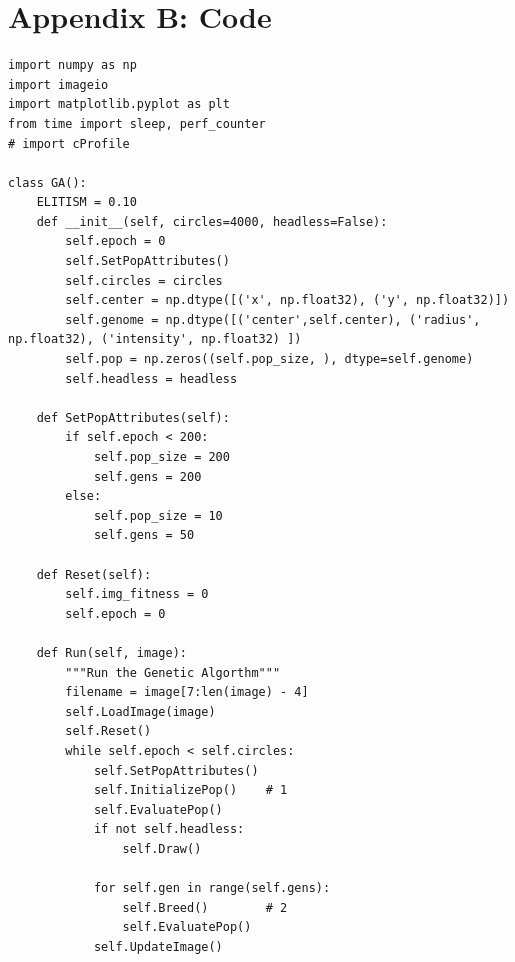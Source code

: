 \documentclass[12pt]{article}
\begin{document}






\newpage
\section*{Appendix B: Code}
\begin{verbatim}
import numpy as np
import imageio
import matplotlib.pyplot as plt
from time import sleep, perf_counter
# import cProfile

class GA():
    ELITISM = 0.10
    def __init__(self, circles=4000, headless=False):
        self.epoch = 0
        self.SetPopAttributes()
        self.circles = circles
        self.center = np.dtype([('x', np.float32), ('y', np.float32)])
        self.genome = np.dtype([('center',self.center), ('radius', np.float32), ('intensity', np.float32) ])
        self.pop = np.zeros((self.pop_size, ), dtype=self.genome)
        self.headless = headless

    def SetPopAttributes(self):
        if self.epoch < 200:
            self.pop_size = 200
            self.gens = 200
        else:
            self.pop_size = 10
            self.gens = 50

    def Reset(self):
        self.img_fitness = 0
        self.epoch = 0

    def Run(self, image):
        """Run the Genetic Algorthm"""
        filename = image[7:len(image) - 4]
        self.LoadImage(image)
        self.Reset()
        while self.epoch < self.circles:
            self.SetPopAttributes()
            self.InitializePop()    # 1
            self.EvaluatePop()
            if not self.headless:
                self.Draw()

            for self.gen in range(self.gens):
                self.Breed()        # 2
                self.EvaluatePop()
            self.UpdateImage()


\end{verbatim}
\end{document}
